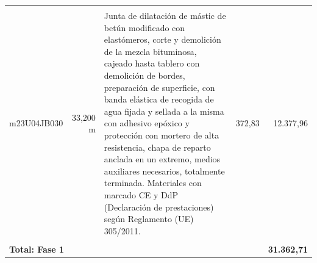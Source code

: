 \documentclass{book}%
\begin{document}
\begin{longtable}{lrlrr}
&&&&\\%
m23U04JB030&    33,200 m&\multicolumn{1}{p{5cm}}{Junta de dilatación de mástic de betún modificado con elastómeros, corte y demolición de la mezcla bituminosa, cajeado hasta tablero con demolición de bordes, preparación de superficie, con banda elástica de recogida de agua fijada y sellada a la misma con adhesivo epóxico y protección con mortero de alta resistencia, chapa de reparto anclada en un extremo, medios auxiliares necesarios, totalmente terminada. Materiales con marcado CE y DdP (Declaración de prestaciones) según Reglamento (UE) 305/2011.}&    372,83&12.377,96\\%
&&&&\\%
\multicolumn{4}{p{8cm}}{\textbf{Total: Fase 1}}&\textbf{31.362,71}\\%
\end{longtable}%
\normalsize

%
\end{document}
